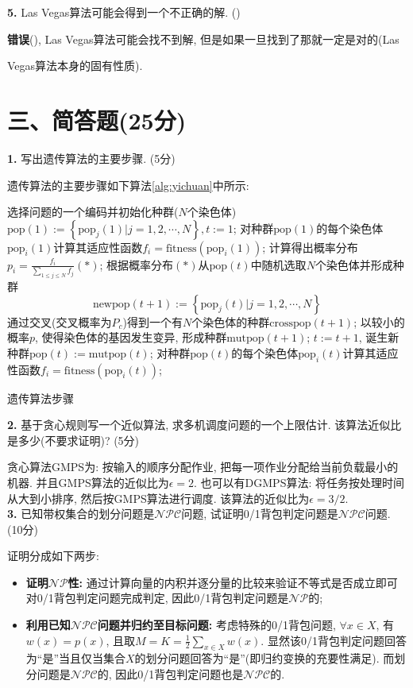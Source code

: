 \documentclass{article}
\begin{document}
\textbf{5.} Las Vegas算法可能会得到一个不正确的解. (\quad)

\solution \textbf{错误}(\XSolidBrush), Las Vegas算法可能会找不到解, 但是如果一旦找到了那就一定是对的(Las 

Vegas算法本身的固有性质).


\section{三、简答题(25分)}

\textbf{1.} 写出遗传算法的主要步骤. (5分)

\solution 遗传算法的主要步骤如下算法\ref{alg:yichuan}中所示:
\begin{algorithm}[H]
    \begin{algorithmic}[1]
    \State 选择问题的一个编码并初始化种群($N$个染色体)$\text{pop}\left( 1 \right) := \left\{ \text{pop}_j\left( 1 \right) |j=1,2,\cdots ,N \right\} ,t:= 1$;
    \State 对种群$\text{pop}(1)$的每个染色体$\text{pop}_i(1)$计算其适应性函数$f_i=\text{fitness}(\text{pop}_i(1))$;
        \State 计算得出概率分布$\displaystyle p_i=\frac{f_i}{\sum_{1\le j\le N}{f_j}}\left( \ast \right) $;
        \State 根据概率分布$(\ast)$从$\text{pop}(t)$中随机选取$N$个染色体并形成种群$$\text{newpop}(t+1):=\left\{ \text{pop}_j\left( t \right) |j=1,2,\cdots ,N \right\}$$
        \State 通过交叉(交叉概率为$P_c$)得到一个有$N$个染色体的种群$\text{crosspop}(t+1)$;
        \State 以较小的概率$p$, 使得染色体的基因发生变异, 形成种群$\text{mutpop}(t+1)$;
        \State $t:=t+1$, 诞生新种群$\text{pop}(t):=\text{mutpop}(t)$;
        \State 对种群$\text{pop}(t)$的每个染色体$\text{pop}_i(t)$计算其适应性函数$f_i=\text{fitness}(\text{pop}_i(t))$;
    \EndWhile
    \end{algorithmic}
    \caption{遗传算法步骤}
    \label{alg:yichuan}
\end{algorithm}

\textbf{2.} 基于贪心规则写一个近似算法, 求多机调度问题的一个上限估计. 该算法近似比是多少(不要求证明)? (5分)

\solution 贪心算法GMPS为: 按输入的顺序分配作业, 把每一项作业分配给当前负载最小的机器. 并且GMPS算法的近似比为$\epsilon = 2$. 也可以有DGMPS算法: 将任务按处理时间从大到小排序, 然后按GMPS算法进行调度. 该算法的近似比为$\epsilon =3/2$.
\\

\textbf{3.} 已知带权集合的划分问题是$\mathcal{NPC}$问题, 试证明0/1背包判定问题是$\mathcal{NPC}$问题. (10分)

\solution 证明分成如下两步:
\begin{itemize}
    \item \textbf{证明$\mathcal{NP}$性:} 通过计算向量的内积并逐分量的比较来验证不等式是否成立即可对0/1背包判定问题完成判定, 因此0/1背包判定问题是$\mathcal{NP}$的;
    \item \textbf{利用已知$\mathcal{NPC}$问题并归约至目标问题:} 考虑特殊的0/1背包问题, $\forall x\in X$, 有$w(x)=p(x)$, 且取$\displaystyle M=K=\frac{1}{2}\sum_{x\in X}{w\left( x \right)}$. 显然该0/1背包判定问题回答为“是”当且仅当集合$X$的划分问题回答为“是”(即归约变换的充要性满足). 而划分问题是$\mathcal{NPC}$的, 因此0/1背包判定问题也是$\mathcal{NPC}$的.
\end{itemize}
\end{document}
